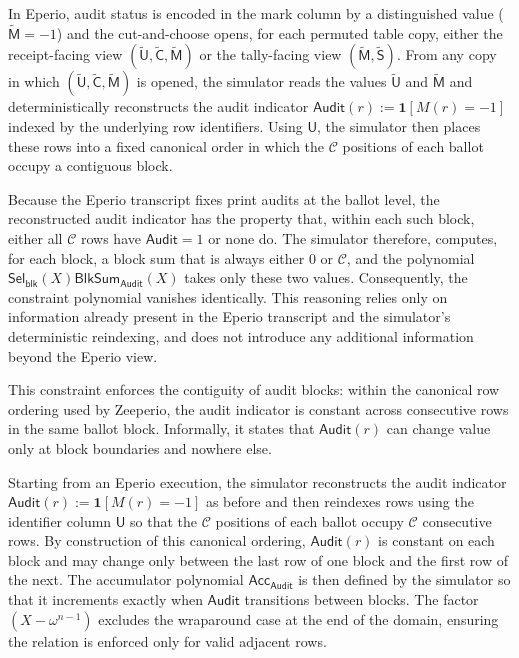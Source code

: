 In Eperio, audit status is encoded in the mark column by a distinguished value ($\widetilde{\mathsf{M}}=-1$) and the cut-and-choose opens, for each permuted
table copy, either the receipt-facing view $(\widetilde{\mathsf{U}},\widetilde{\mathsf{C}},\widetilde{\mathsf{M}})$ or the tally-facing view $(\widetilde{\mathsf{M}},\widetilde{\mathsf{S}})$. From any copy in which $(\widetilde{\mathsf{U}},\widetilde{\mathsf{C}},\widetilde{\mathsf{M}})$ is opened, the simulator reads the values
$\widetilde{\mathsf{U}}$ and $\widetilde{\mathsf{M}}$ and deterministically reconstructs the audit indicator $\mathsf{Audit}(r):=\mathbf{1}[M(r)=-1]$ indexed by the underlying row identifiers. Using $\mathsf{U}$, the simulator then places these rows into a fixed canonical order in which the $\mathcal{C}$ positions of each ballot occupy a contiguous block.

Because the Eperio transcript fixes print audits at the ballot level, the reconstructed audit indicator has the property that, within each such block, either all $\mathcal{C}$ rows have $\mathsf{Audit}=1$ or none do. The simulator therefore, computes, for each block, a block sum that is always either $0$ or $\mathcal{C}$, and the polynomial
$\mathsf{Sel}_{\mathsf{blk}}(X)\mathsf{BlkSum}_{\mathsf{Audit}}(X)$ takes only these two values. Consequently, the constraint polynomial vanishes identically. This reasoning relies only on information already present in the Eperio transcript and the simulator’s deterministic reindexing, and does not introduce any additional information beyond the Eperio view.


This constraint enforces the contiguity of audit blocks: within the canonical row ordering used by Zeeperio, the audit indicator is constant across consecutive rows in the same ballot block. Informally, it states that $\mathsf{Audit}(r)$ can change value only at block boundaries and nowhere else.

Starting from an Eperio execution, the simulator reconstructs the audit indicator $\mathsf{Audit}(r):=\mathbf{1}[M(r)=-1]$ as before and then reindexes rows using the identifier column $\mathsf{U}$ so that the $\mathcal{C}$ positions of each ballot occupy $\mathcal{C}$ consecutive rows. By construction of this canonical
ordering, $\mathsf{Audit}(r)$ is constant on each block and may change only between the last row of one block and the first row of the next. The accumulator polynomial $\mathsf{Acc}_{\mathsf{Audit}}$ is then defined by the simulator so that it increments exactly when $\mathsf{Audit}$ transitions between blocks. The factor $(X-\omega^{n-1})$ excludes the wraparound case at the end of the domain, ensuring the relation is enforced only for valid adjacent rows.

